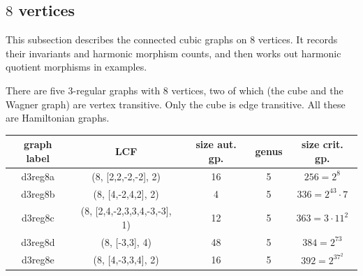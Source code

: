 \documentclass[12pt,letterpaper]{article}
\theoremstyle{definition}
\begin{document}
\subsection{\texorpdfstring{$8$}{8} vertices}
\label{sec:cubic-8-vertices}

This subsection describes the connected cubic graphs on $8$ vertices.
It records their invariants and harmonic morphism counts, and then
works out harmonic quotient morphisms in examples.


There are five $3$-regular graphs with $8$ vertices, two of which
(the cube and the Wagner graph) are vertex transitive. Only the cube is
edge transitive.
All these are Hamiltonian graphs.



\begin{center}
\begin{tabular}{c|c|c|c|c}
  graph label & LCF & size aut. gp. & genus & size crit. gp. \\ \hline
  d3reg8a & (8, [2,2,-2,-2], 2) & 16 & 5 & $256=2^8$ \\
  d3reg8b & (8, [4,-2,4,2], 2) & 4 & 5 & $336=2^43\cdot 7$ \\
  d3reg8c & (8, [2,4,-2,3,3,4,-3,-3], 1) & 12 & 5 & $363=3\cdot 11^2$ \\
  d3reg8d & (8, [-3,3], 4) & 48 & 5 & $384=2^73$ \\ 
  d3reg8e & (8, [4,-3,3,4], 2) & 16 & 5 & $392=2^37^2$ \\
\end{tabular}
\end{center}  
\end{document}
